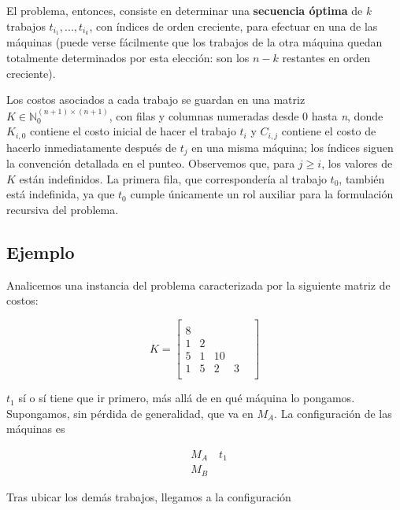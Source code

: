 \documentclass[a4paper]{report}
\begin{document}
El problema, entonces, consiste en determinar una \textbf{secuencia óptima} de \textit{k} trabajos $t_{i_{1}},...,t_{i_{k}}$, con índices de orden creciente, para efectuar en una de las máquinas (puede verse fácilmente que los trabajos de la otra máquina quedan totalmente determinados por esta elección: son los $n-k$ restantes en orden creciente).

Los costos asociados a cada trabajo se guardan en una matriz $K \in \mathbb{N}^{(n+1) \times (n+1)}_{0}$, con filas y columnas numeradas desde 0 hasta \textit{n}, donde $K_{i,0}$ contiene el costo inicial de hacer el trabajo $t_{i}$ y $C_{i,j}$ contiene el costo de hacerlo inmediatamente después de $t_{j}$ en una misma máquina; los índices siguen la convención detallada en el punteo. Observemos que, para $j \geq i$, los valores de $K$ están indefinidos. La primera fila, que correspondería al trabajo $t_{0}$, también está indefinida, ya que $t_{0}$ cumple únicamente un rol auxiliar para la formulación recursiva del problema.

\subsection{Ejemplo}

Analicemos una instancia del problema caracterizada por la siguiente matriz de costos:

\[
K=
  \begin{bmatrix}
    \\
    8 \\
    1 & 2 \\
    5 & 1 & 10 \\
    1 & 5 & 2 & 3 & \\
  \end{bmatrix}
\]

\medskip

$t_{1}$ sí o sí tiene que ir primero, más allá de en qué máquina lo pongamos. Supongamos, sin pérdida de generalidad, que va en $M_{A}$. La configuración de las máquinas es

\begin{equation*}
    \begin{aligned}
        & M_{A} \quad t_{1} \\
        & M_{B}
    \end{aligned}
\end{equation*}

\medskip

Tras ubicar los demás trabajos, llegamos a la configuración
\end{document}
